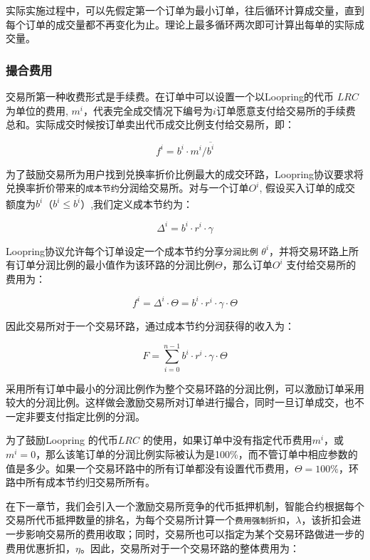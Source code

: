 \documentclass[UTF8,nofonts]{ctexart}
\begin{document}
实际实施过程中，可以先假定第一个订单为最小订单，往后循环计算成交量，直到每个订单的成交量都不再变化为止。理论上最多循环两次即可计算出每单的实际成交量。

\subsubsection{撮合费用\label{sec:fee}}

交易所第一种收费形式是手续费。在订单中可以设置一个以Loopring的代币 $LRC$为单位的费用, $m^i$，代表完全成交情况下编号为$i$订单愿意支付给交易所的手续费总和。实际成交时候按订单卖出代币成交比例支付给交易所，即：

\begin{equation*}
f^i = b^i \cdot m^i  / \overline{b^i}
\end{equation*}


为了鼓励交易所为用户找到兑换率折价比例最大的成交环路，Loopring协议要求将兑换率折价带来的\texttt{成本节约}分润给交易所。对与一个订单$O^i$, 假设买入订单的成交额度为$b^i$（$b^i \le \overline{b^i}$）,我们定义成本节约为：

\begin{equation*}
\Delta^i = b^i \cdot r^i \cdot \gamma
\end{equation*}

Loopring协议允许每个订单设定一个成本节约分享\texttt{分润比例} $\theta^i$，并将交易环路上所有订单分润比例的最小值作为该环路的分润比例$\Theta$，那么订单$O^i$ 支付给交易所的费用为：


\begin{equation*}
f^i = \Delta^i \cdot \Theta = b^i \cdot r^i \cdot \gamma \cdot \Theta
\end{equation*}

因此交易所对于一个交易环路，通过成本节约分润获得的收入为：

\begin{equation*}
F = \sum^{n-1}_{i=0} b^i \cdot r^i \cdot \gamma \cdot \Theta
\end{equation*}

采用所有订单中最小的分润比例作为整个交易环路的分润比例，可以激励订单采用较大的分润比例。这样做会激励交易所对订单进行撮合，同时一旦订单成交，也不一定非要支付指定比例的分润。


为了鼓励Loopring 的代币$LRC$ 的使用，如果订单中没有指定代币费用$m^i$，或$m^i=0$，那么该笔订单的分润比例实际被认为是100\%，而不管订单中相应参数的值是多少。如果一个交易环路中的所有订单都没有设置代币费用，$\Theta=100\%$，环路中所有成本节约归交易所所有。


在下一章节，我们会引入一个激励交易所竞争的代币抵押机制，智能合约根据每个交易所代币抵押数量的排名，为每个交易所计算一个\texttt{费用强制折扣}，$\lambda$，该折扣会进一步影响交易所的费用收取；同时，交易所也可以指定为某个交易环路做进一步的费用优惠折扣，$\eta$。因此，交易所对于一个交易环路的整体费用为：
\end{document}
